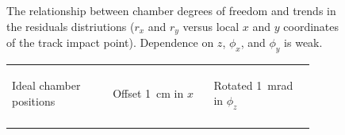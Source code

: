 \documentclass[12pt]{article}
\begin{document}
\begin{figure}
\caption{\label{profile_prediciton} The relationship between chamber
  degrees of freedom and trends in the residuals distriutions ($r_x$
  and $r_y$ versus local $x$ and $y$ coordinates of the track impact
  point).  Dependence on $z$, $\phi_x$, and $\phi_y$ is weak.}
\end{figure}


\begin{figure}
  \begin{center}

    \begin{tabular}{p{0.3\linewidth} p{0.3\linewidth} p{0.3\linewidth}}
      \begin{minipage}{\linewidth}
	\begin{center} \mbox{\hspace{0.4 cm}} Ideal chamber positions \end{center}
      \end{minipage} &
      \begin{minipage}{\linewidth}
	\begin{center} \mbox{\hspace{0.4 cm}} Offset 1~cm in $x$ \end{center}
      \end{minipage} &
      \begin{minipage}{\linewidth}
	\begin{center} \mbox{\hspace{0.4 cm}} Rotated 1~mrad in $\phi_z$ \end{center}
      \end{minipage} \\
      \begin{minipage}{\linewidth}

\end{minipage}
\end{tabular}
\end{center}
\end{figure}
\end{document}
